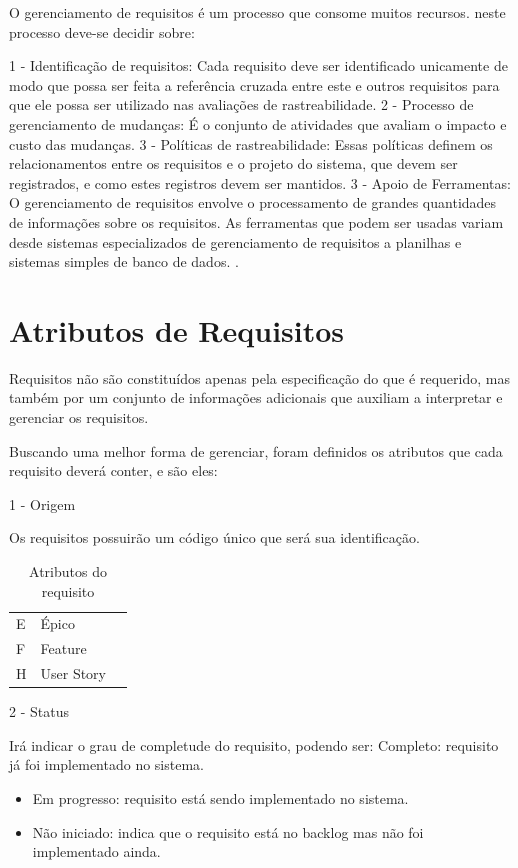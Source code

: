 O gerenciamento de requisitos é um processo que consome muitos recursos. neste processo deve-se decidir sobre:

1 - Identificação de requisitos: Cada requisito deve ser identificado unicamente de modo que possa ser feita a referência cruzada entre este e outros requisitos para que ele possa ser utilizado nas avaliações de rastreabilidade.
2 - Processo de gerenciamento de mudanças: É o conjunto de atividades que avaliam o impacto e custo das mudanças.
3 - Políticas de rastreabilidade: Essas políticas definem os relacionamentos entre os requisitos e o projeto do sistema, que devem ser registrados, e como estes registros devem ser mantidos.
3 - Apoio de Ferramentas: O gerenciamento de requisitos envolve o processamento de grandes quantidades de informações sobre os requisitos. As ferramentas que podem ser usadas variam desde sistemas especializados de gerenciamento de requisitos a planilhas  e sistemas simples de banco de dados.
\cite {ian}.

\section{Atributos de Requisitos}

Requisitos não são constituídos apenas pela especificação do que é requerido, mas também por um conjunto de informações adicionais que auxiliam a interpretar e gerenciar os requisitos. \cite{santiago}

Buscando uma melhor forma de gerenciar, foram definidos os atributos que cada requisito deverá conter, e são eles:

1 - Origem

Os requisitos possuirão um código único que será sua identificação.

\begin{table}[\htp]
\centering
\caption{Atributos do requisito}
\label{my-label}
\begin{tabular}{|l|l|l}
\cline{1-2}
E & Épico      &  \\ \cline{1-2}
F & Feature    &  \\ \cline{1-2}
H & User Story &  \\ \cline{1-2}
\end{tabular}
\end{table}


2 - Status

Irá indicar o grau de completude do requisito, podendo ser:
Completo: requisito já foi implementado no sistema.

\begin{itemize}
\item Em progresso: requisito está sendo implementado no sistema.
\item Não iniciado: indica que o requisito está no backlog mas não foi implementado ainda.
\end{itemize}

